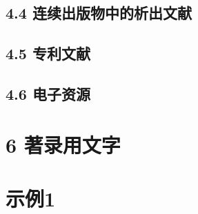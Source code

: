 \documentclass{article}
\begin{document}
\subsection*{4.4 连续出版物中的析出文献}
\begin{refsection}

\nocite{袁训来2012-3219-3219,
余建斌2013--,
李炳穆2008-6-12,
李幼平2010-225-228,
武丽丽2008-8-9,
Kanamori1998-2063-2063,
Caplan1993-61-66,
Frese2013-378-398,
Myburg2014-356-362
}

\printbibliography[heading=subbibliography,title={示例:}]
\end{refsection}

\subsection*{4.5 专利文献}
\begin{refsection}

\nocite{邓一刚2006--,
西安电子科技大学2002--,
Tachibana2005--}

{
\printbibliography[heading=subbibliography,title={示例:}]
}
\end{refsection}

\subsection*{4.6 电子资源}
\begin{refsection}

\nocite{中国互联网络信息中心2012--,
北京市人民政府办公厅2005--,
Bawden2008--,
OCLC--,
Hopkinson2009--
}

{
\printbibliography[heading=subbibliography,title={示例:}]
}
\end{refsection}

\section*{6 著录用文字}
\section*{示例1}
\begin{refsection}
\nocite{周鲁卫2011--}
\nocite{常森2013--}
\nocite{kereanrefa}
\nocite{japaneserefc}
\nocite{RUDDOCK2009--}
\nocite{russianrefc}
\printbibliography[heading=subbibliography,title={用原语种著录参考文献}]
\end{refsection}
\end{document}
